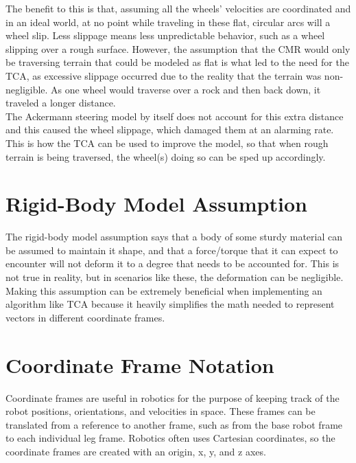 The benefit to this is that, assuming all the wheels' velocities are coordinated and in an ideal world, at no point while traveling in these flat, circular arcs will a wheel slip. Less slippage means less unpredictable behavior, such as a wheel slipping over a rough surface. However, the assumption that the \ac{CMR} would only be traversing terrain that could be modeled as flat is what led to the need for the \ac{TCA}, as excessive slippage occurred due to the reality that the terrain was non-negligible. As one wheel would traverse over a rock and then back down, it traveled a longer distance. \\

The Ackermann steering model by itself does not account for this extra distance and this caused the wheel slippage, which damaged them at an alarming rate. This is how the \ac{TCA} can be used to improve the model, so that when rough terrain is being traversed, the wheel(s) doing so can be sped up accordingly.

\section{Rigid-Body Model Assumption}\label{traction_control:algorithms:rigid-body}
The rigid-body model assumption says that a body of some sturdy material can be assumed to maintain it shape, and that a force/torque that it can expect to encounter will not deform it to a degree that needs to be accounted for. This is not true in reality, but in scenarios like these, the deformation can be negligible. \\

Making this assumption can be extremely beneficial when implementing an algorithm like \ac{TCA} because it heavily simplifies the math needed to represent vectors in different coordinate frames.

\section{Coordinate Frame Notation}
%

Coordinate frames are useful in robotics for the purpose of keeping track of the robot positions, orientations, and velocities in space. These frames can be translated from  a reference to another frame, such as from the base robot frame to each individual leg frame. Robotics often uses Cartesian coordinates, so the coordinate frames are created with an origin, x, y, and z axes. \\

